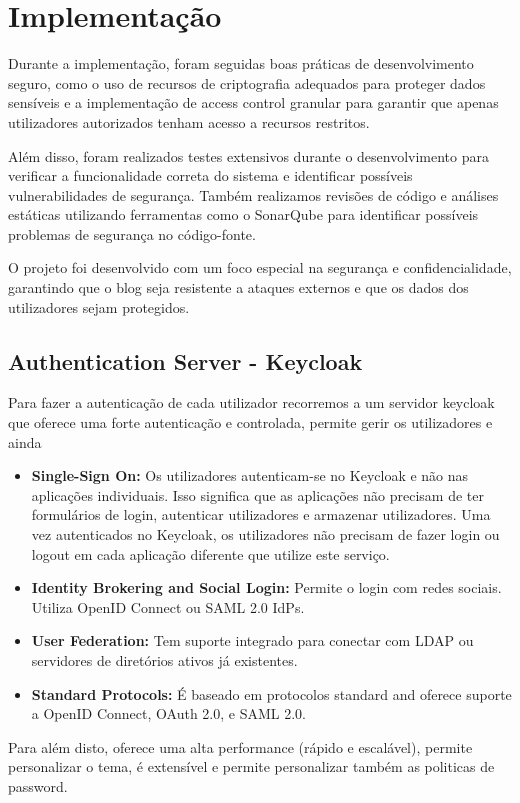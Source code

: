 \documentclass[conference]{IEEEtran}
\begin{document}
\section{Implementação}

Durante a implementação, foram seguidas boas práticas de desenvolvimento seguro, como o uso de recursos de criptografia adequados para proteger dados sensíveis e a implementação de access control granular para garantir que apenas utilizadores autorizados tenham acesso a recursos restritos.

Além disso, foram realizados testes extensivos durante o desenvolvimento para verificar a funcionalidade correta do sistema e identificar possíveis vulnerabilidades de segurança. Também realizamos revisões de código e análises estáticas utilizando ferramentas como o SonarQube para identificar possíveis problemas de segurança no código-fonte.

O projeto foi desenvolvido com um foco especial na segurança e confidencialidade, garantindo que o blog seja resistente a ataques externos e que os dados dos utilizadores sejam protegidos.

\subsection{Authentication Server - Keycloak}
Para fazer a autenticação de cada utilizador recorremos a um servidor keycloak que oferece uma forte autenticação e controlada, permite gerir os utilizadores e ainda
\begin{itemize}
    \item \textbf{Single-Sign On:} Os utilizadores autenticam-se no Keycloak e não nas aplicações individuais. Isso significa que as aplicações não precisam de ter formulários de login, autenticar utilizadores e armazenar utilizadores. Uma vez autenticados no Keycloak, os utilizadores não precisam de fazer login ou logout em cada aplicação diferente que utilize este serviço.
    \item \textbf{Identity Brokering and Social Login:} Permite o login com redes sociais. Utiliza OpenID Connect ou SAML 2.0 IdPs.
    \item \textbf{User Federation:} Tem suporte integrado para conectar com LDAP ou servidores de diretórios ativos já existentes.
    \item \textbf{Standard Protocols:} É baseado em protocolos standard and oferece suporte a OpenID Connect, OAuth 2.0, e SAML 2.0.
\end{itemize}
Para além disto, oferece uma alta performance (rápido e escalável), permite personalizar o tema, é extensível e permite personalizar também as politicas de password.
\end{document}
